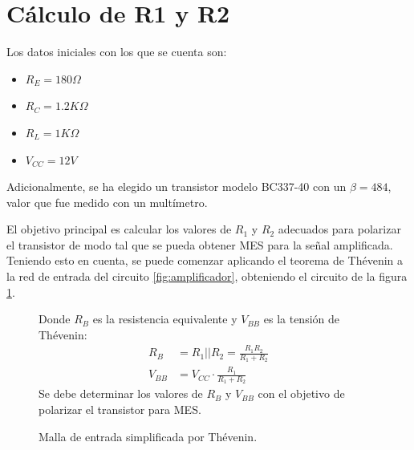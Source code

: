 \section{Cálculo de R1 y R2} \label{section:calc_r1_r2}
Los datos iniciales con los que se cuenta son:
\begin{itemize}
    \item $R_E = 180\Omega$
    \item $R_C = 1.2K\Omega$
    \item $R_L = 1K\Omega$
    \item $V_{CC} = 12V$
\end{itemize}
Adicionalmente, se ha elegido un transistor modelo BC337-40 con un $\beta = 484$, valor que fue medido con un
multímetro.

El objetivo principal es calcular los valores de $R_1$ y $R_2$ adecuados para polarizar el transistor de modo tal que
se pueda obtener MES para la señal amplificada. Teniendo esto en cuenta, se puede comenzar aplicando el teorema de
Thévenin a la red de entrada del circuito \ref{fig:amplificador}, obteniendo el circuito de la figura
\ref{fig:malla-entrada}.

\begin{figure}[H]
    \centering
    \begin{minipage}{0.4\textwidth}
        \centering
        \caption{Malla de entrada simplificada por Thévenin.}
        \label{fig:malla-entrada}
    \end{minipage}%
    \begin{minipage}{0.4\textwidth}
        \centering
        Donde $R_{B}$ es la resistencia equivalente y $V_{BB}$ es la tensión de Thévenin:
        \begin{align}
            R_{B} &= R_1||R_2=\frac{R_1 R_2}{R_1 + R_2} \label{ec:thevenin-rb}\\
            V_{BB} &= V_{CC} \cdot \frac{R_1}{R_1 + R_2} \label{ec:thevenin-vbb}
        \end{align}
        Se debe determinar los valores de $R_B$ y $V_{BB}$ con el objetivo de polarizar
        el transistor para MES.
    \end{minipage}
\end{figure}

